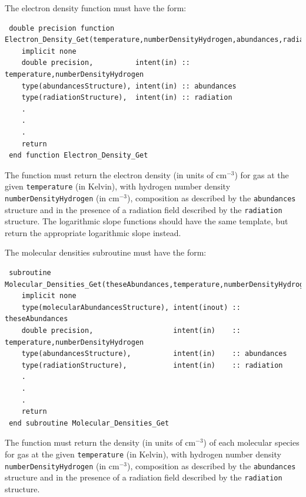 The electron density function must have the form:
\begin{verbatim}
 double precision function Electron_Density_Get(temperature,numberDensityHydrogen,abundances,radiation)
    implicit none
    double precision,          intent(in) :: temperature,numberDensityHydrogen
    type(abundancesStructure), intent(in) :: abundances
    type(radiationStructure),  intent(in) :: radiation
    .
    .
    .
    return
 end function Electron_Density_Get
\end{verbatim}
The function must return the electron density (in units of cm$^{-3}$) for gas at the given {\tt temperature} (in Kelvin), with hydrogen number density {\tt numberDensityHydrogen} (in cm$^{-3}$), composition as described by the {\tt abundances} structure and in the presence of a radiation field described by the {\tt radiation} structure. The logarithmic slope functions should have the same template, but return the appropriate logarithmic slope instead.

The molecular densities subroutine must have the form:
\begin{verbatim}
 subroutine Molecular_Densities_Get(theseAbundances,temperature,numberDensityHydrogen,abundances,radiation)
    implicit none
    type(molecularAbundancesStructure), intent(inout) :: theseAbundances
    double precision,                   intent(in)    :: temperature,numberDensityHydrogen
    type(abundancesStructure),          intent(in)    :: abundances
    type(radiationStructure),           intent(in)    :: radiation
    .
    .
    .
    return
 end subroutine Molecular_Densities_Get
\end{verbatim}
The function must return the density (in units of cm$^{-3}$) of each molecular species for gas at the given {\tt temperature} (in Kelvin), with hydrogen number density {\tt numberDensityHydrogen} (in cm$^{-3}$), composition as described by the {\tt abundances} structure and in the presence of a radiation field described by the {\tt radiation} structure.

